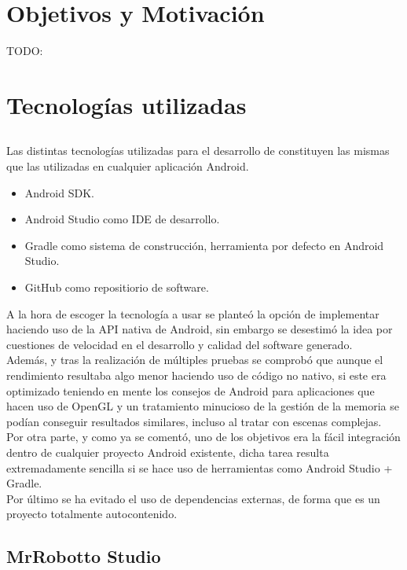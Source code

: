 
\section{Objetivos y Motivación}
TODO:

\section{Tecnologías utilizadas}

\subsection{\robotto}

Las distintas tecnologías utilizadas para el desarrollo de \robotto constituyen las mismas que las utilizadas en cualquier aplicación Android.

\begin{itemize}
\item Android SDK.
\item Android Studio como IDE de desarrollo.
\item Gradle como sistema de construcción, herramienta por defecto en Android Studio.
\item GitHub como repositiorio de software.
\end{itemize}

A la hora de escoger la tecnología a usar se planteó la opción de implementar \robotto haciendo uso de la API nativa de Android, sin embargo se desestimó la idea por cuestiones de velocidad en el desarrollo y calidad del software generado.\\
Además, y tras la realización de múltiples pruebas se comprobó que aunque el rendimiento resultaba algo menor haciendo uso de código no nativo, si este era optimizado teniendo en mente los consejos de Android para aplicaciones que hacen uso de OpenGL y un tratamiento minucioso de la gestión de la memoria se podían conseguir resultados similares, incluso al tratar con escenas complejas.\\
Por otra parte, y como ya se comentó, uno de los objetivos era la fácil integración dentro de cualquier proyecto Android existente, dicha tarea resulta extremadamente sencilla si se hace uso de herramientas como Android Studio + Gradle.\\
Por último se ha evitado el uso de dependencias externas, de forma que \robotto es un proyecto totalmente autocontenido.\\

\subsection{MrRobotto Studio}
